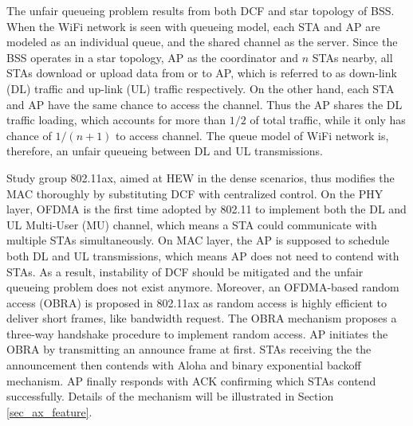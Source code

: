 \documentclass[journal]{IEEEtran}
\begin{document}
The unfair queueing problem results from both DCF and star topology of BSS.
When the WiFi network is seen with queueing model, each STA and AP are modeled as an individual queue, and the shared channel as the server. 
Since the BSS operates in a star topology, AP as the coordinator and $n$ STAs nearby, all STAs download or upload data from or to AP, which is referred to as down-link (DL) traffic and up-link (UL) traffic respectively.
On the other hand, each STA and AP have the same chance to access the channel. 
Thus the AP shares the DL traffic loading, which accounts for more than $1/2$ of total traffic, while it only has chance of $1/(n+1)$ to access channel.
The queue model of WiFi network is, therefore, an unfair queueing between DL and UL transmissions. 


Study group 802.11ax, aimed at HEW in the dense scenarios, thus modifies the MAC thoroughly by substituting DCF with centralized control. 
On the PHY layer, OFDMA is the first time adopted by 802.11 to implement both the DL and UL Multi-User (MU) channel, which means a STA could communicate with multiple STAs simultaneously.
On MAC layer, the AP is supposed to schedule both DL and UL transmissions, which means AP does not need to contend with STAs. 
As a result, instability of DCF should be mitigated and the unfair queueing problem does not exist anymore.
Moreover, an OFDMA-based random access (OBRA) is proposed in 802.11ax as random access is highly efficient to deliver short frames, like bandwidth request. 
The OBRA mechanism proposes a three-way handshake procedure to implement random access.
AP initiates the OBRA by transmitting an announce frame at first. 
STAs receiving the the announcement then contends with Aloha and binary exponential backoff mechanism. 
AP finally responds with ACK confirming which STAs contend successfully.
Details of the mechanism will be illustrated in Section \ref{sec_ax_feature}.
\end{document}
